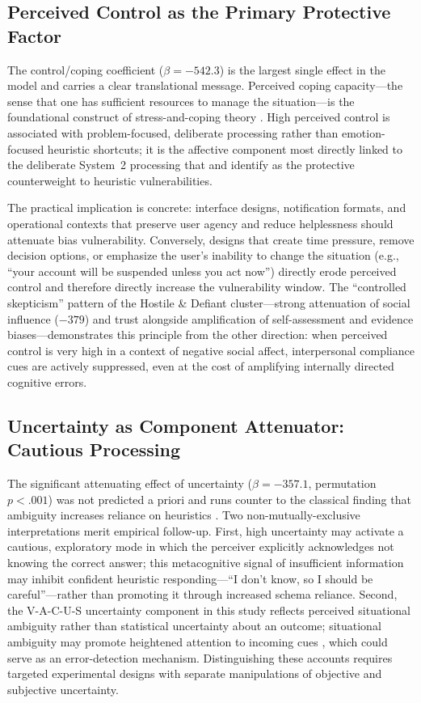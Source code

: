 \documentclass[12pt,a4paper]{article}
\newcommand{\vacus}{V-A-C-U-S}
\begin{document}
\newpage
\subsection{Perceived Control as the Primary Protective Factor}

The control/coping coefficient ($\beta = -542.3$) is the largest single effect in the model and carries a clear translational message. Perceived coping capacity---the sense that one has sufficient resources to manage the situation---is the foundational construct of stress-and-coping theory \citep{lazarus1984stress}. High perceived control is associated with problem-focused, deliberate processing rather than emotion-focused heuristic shortcuts; it is the affective component most directly linked to the deliberate System~2 processing that \citet{kahneman2011thinking} and \citet{evans2008dual} identify as the protective counterweight to heuristic vulnerabilities.

The practical implication is concrete: interface designs, notification formats, and operational contexts that preserve user agency and reduce helplessness should attenuate bias vulnerability. Conversely, designs that create time pressure, remove decision options, or emphasize the user's inability to change the situation (e.g., ``your account will be suspended unless you act now'') directly erode perceived control and therefore directly increase the vulnerability window. The ``controlled skepticism'' pattern of the Hostile \& Defiant cluster---strong attenuation of social influence ($-379$) and trust alongside amplification of self-assessment and evidence biases---demonstrates this principle from the other direction: when perceived control is very high in a context of negative social affect, interpersonal compliance cues are actively suppressed, even at the cost of amplifying internally directed cognitive errors.

\subsection{Uncertainty as Component Attenuator: Cautious Processing}

The significant attenuating effect of uncertainty ($\beta = -357.1$, permutation $p < .001$) was not predicted a priori and runs counter to the classical finding that ambiguity increases reliance on heuristics \citep{tversky1974judgment, kahneman2011thinking}. Two non-mutually-exclusive interpretations merit empirical follow-up. First, high uncertainty may activate a cautious, exploratory mode in which the perceiver explicitly acknowledges not knowing the correct answer; this metacognitive signal of insufficient information may inhibit confident heuristic responding---``I don't know, so I should be careful''---rather than promoting it through increased schema reliance. Second, the \vacus{} uncertainty component in this study reflects perceived situational ambiguity rather than statistical uncertainty about an outcome; situational ambiguity may promote heightened attention to incoming cues \citep{lerner2015emotion}, which could serve as an error-detection mechanism. Distinguishing these accounts requires targeted experimental designs with separate manipulations of objective and subjective uncertainty.
\end{document}
